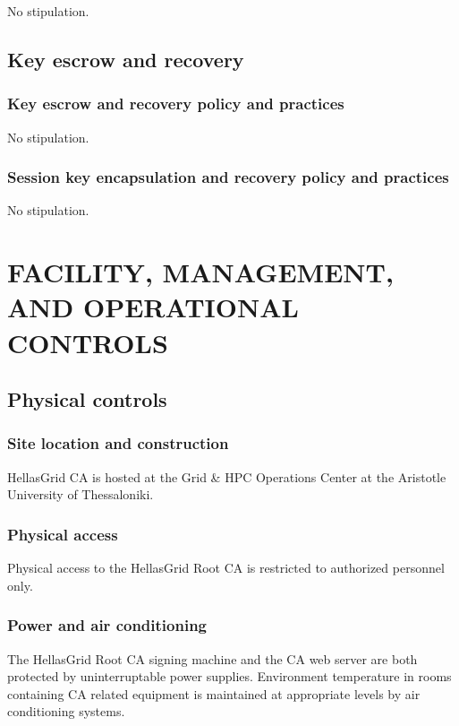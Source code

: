 \documentclass[11pt,a4paper,titlepage]{book}
\begin{document}
No stipulation.

\section{Key escrow and recovery}


\subsection{Key escrow and recovery policy and practices}

No stipulation.

\subsection{Session key encapsulation and recovery policy and practices}

No stipulation.

\chapter{FACILITY, MANAGEMENT, AND OPERATIONAL CONTROLS}
\section{Physical controls}
\subsection{Site location and construction}

HellasGrid CA is hosted at the Grid \& HPC Operations Center at the Aristotle University of Thessaloniki.


\subsection{Physical access}

Physical access to the HellasGrid Root CA is restricted to authorized personnel only.

\subsection{Power and air conditioning}

The HellasGrid Root CA signing machine and the CA web server are both protected by uninterruptable power supplies. Environment temperature in rooms containing CA related equipment is maintained at appropriate levels by air conditioning systems.
\end{document}
